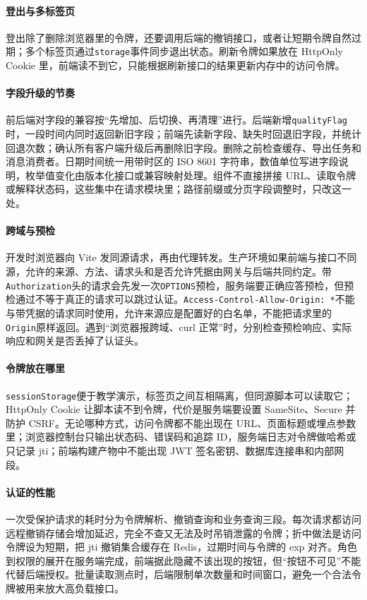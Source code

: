 \paragraph{登出与多标签页}登出除了删除浏览器里的令牌，还要调用后端的撤销接口，或者让短期令牌自然过期；多个标签页通过\texttt{storage}事件同步退出状态。刷新令牌如果放在 HttpOnly Cookie 里，前端读不到它，只能根据刷新接口的结果更新内存中的访问令牌。

\paragraph{字段升级的节奏}前后端对字段的兼容按“先增加、后切换、再清理”进行。后端新增\texttt{qualityFlag}时，一段时间内同时返回新旧字段；前端先读新字段、缺失时回退旧字段，并统计回退次数；确认所有客户端升级后再删除旧字段。删除之前检查缓存、导出任务和消息消费者。日期时间统一用带时区的 ISO 8601 字符串，数值单位写进字段说明，枚举值变化由版本化接口或兼容映射处理。组件不直接拼接 URL、读取令牌或解释状态码，这些集中在请求模块里；路径前缀或分页字段调整时，只改这一处。

\paragraph{跨域与预检}开发时浏览器向 Vite 发同源请求，再由代理转发。生产环境如果前端与接口不同源，允许的来源、方法、请求头和是否允许凭据由网关与后端共同约定。带\texttt{Authorization}头的请求会先发一次\texttt{OPTIONS}预检，服务端要正确应答预检，但预检通过不等于真正的请求可以跳过认证。\texttt{Access-Control-Allow-Origin: *}不能与带凭据的请求同时使用，允许来源应是配置好的白名单，不能把请求里的\texttt{Origin}原样返回。遇到“浏览器报跨域、curl 正常”时，分别检查预检响应、实际响应和网关是否丢掉了认证头。

\paragraph{令牌放在哪里}\texttt{sessionStorage}便于教学演示，标签页之间互相隔离，但同源脚本可以读取它；HttpOnly Cookie 让脚本读不到令牌，代价是服务端要设置 SameSite、Secure 并防护 CSRF。无论哪种方式，访问令牌都不能出现在 URL、页面标题或埋点参数里；浏览器控制台只输出状态码、错误码和追踪 ID，服务端日志对令牌做哈希或只记录 jti；前端构建产物中不能出现 JWT 签名密钥、数据库连接串和内部网段。

\paragraph{认证的性能}一次受保护请求的耗时分为令牌解析、撤销查询和业务查询三段。每次请求都访问远程撤销存储会增加延迟，完全不查又无法及时吊销泄露的令牌；折中做法是访问令牌设为短期，把 jti 撤销集合缓存在 Redis，过期时间与令牌的 exp 对齐。角色到权限的展开在服务端完成，前端据此隐藏不该出现的按钮，但“按钮不可见”不能代替后端授权。批量读取测点时，后端限制单次数量和时间窗口，避免一个合法令牌被用来放大高负载接口。

